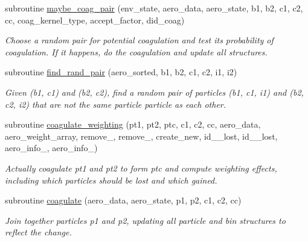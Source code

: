 \begin{DoxyCompactItemize}
subroutine \mbox{\hyperlink{namespacepmc__coagulation_a25340bbe4cbc91edfe95036aa4732cbb}{maybe\+\_\+coag\+\_\+pair}} (env\+\_\+state, aero\+\_\+data, aero\+\_\+state, b1, b2, c1, c2, cc, coag\+\_\+kernel\+\_\+type, accept\+\_\+factor, did\+\_\+coag)
\begin{DoxyCompactList}\small\item\em Choose a random pair for potential coagulation and test its probability of coagulation. If it happens, do the coagulation and update all structures. \end{DoxyCompactList}\item 
subroutine \mbox{\hyperlink{namespacepmc__coagulation_a3911bb2973186595a452bffc1bf37e9e}{find\+\_\+rand\+\_\+pair}} (aero\+\_\+sorted, b1, b2, c1, c2, i1, i2)
\begin{DoxyCompactList}\small\item\em Given {\ttfamily (b1, c1)} and {\ttfamily (b2, c2)}, find a random pair of particles {\ttfamily (b1, c1, i1)} and {\ttfamily (b2, c2, i2)} that are not the same particle particle as each other. \end{DoxyCompactList}\item 
subroutine \mbox{\hyperlink{namespacepmc__coagulation_a5cc62e6e5a1af2843681d766563f6364}{coagulate\+\_\+weighting}} (pt1, pt2, ptc, c1, c2, cc, aero\+\_\+data, aero\+\_\+weight\+\_\+array, remove\+\_, remove\+\_, create\+\_\+new, id\+\_\+\_\+lost, id\+\_\+\_\+lost, aero\+\_\+info\+\_, aero\+\_\+info\+\_)
\begin{DoxyCompactList}\small\item\em Actually coagulate pt1 and pt2 to form ptc and compute weighting effects, including which particles should be lost and which gained. \end{DoxyCompactList}\item 
subroutine \mbox{\hyperlink{namespacepmc__coagulation_a8bcb727a5fd3e8551a3139f75b996590}{coagulate}} (aero\+\_\+data, aero\+\_\+state, p1, p2, c1, c2, cc)
\begin{DoxyCompactList}\small\item\em Join together particles {\ttfamily p1} and {\ttfamily p2}, updating all particle and bin structures to reflect the change. \end{DoxyCompactList}\end{DoxyCompactItemize}
